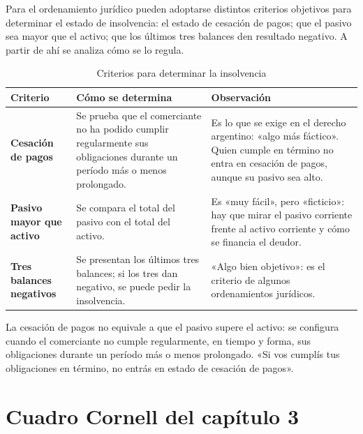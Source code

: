 \documentclass[12pt,oneside]{book}
\begin{document}
Para el ordenamiento jurídico pueden adoptarse distintos criterios objetivos para determinar el estado de insolvencia: el estado de cesación de pagos; que el pasivo sea mayor que el activo; que los últimos tres balances den resultado negativo. A partir de ahí se analiza cómo se lo regula.

\begin{table}[H]
\centering
\caption{Criterios para determinar la insolvencia}
\begin{tabularx}{\textwidth}{>{\raggedright\arraybackslash}p{} >{\raggedright\arraybackslash}X >{\raggedright\arraybackslash}X}
\toprule
\textbf{Criterio} & \textbf{Cómo se determina} & \textbf{Observación} \\
\midrule
\textbf{Cesación de pagos} & Se prueba que el comerciante no ha podido cumplir regularmente sus obligaciones durante un período más o menos prolongado. & Es lo que se exige en el derecho argentino: «algo más fáctico». Quien cumple en término no entra en cesación de pagos, aunque su pasivo sea alto. \\
\textbf{Pasivo mayor que activo} & Se compara el total del pasivo con el total del activo. & Es «muy fácil», pero «ficticio»: hay que mirar el pasivo corriente frente al activo corriente y cómo se financia el deudor. \\
\textbf{Tres balances negativos} & Se presentan los últimos tres balances; si los tres dan negativo, se puede pedir la insolvencia. & «Algo bien objetivo»: es el criterio de algunos ordenamientos jurídicos. \\
\bottomrule
\end{tabularx}
\end{table}

\begin{important}
La cesación de pagos no equivale a que el pasivo supere el activo: se configura cuando el comerciante no cumple regularmente, en tiempo y forma, sus obligaciones durante un período más o menos prolongado. «Si vos cumplís tus obligaciones en término, no entrás en estado de cesación de pagos».
\end{important}

\section{Cuadro Cornell del capítulo 3}
\end{document}
